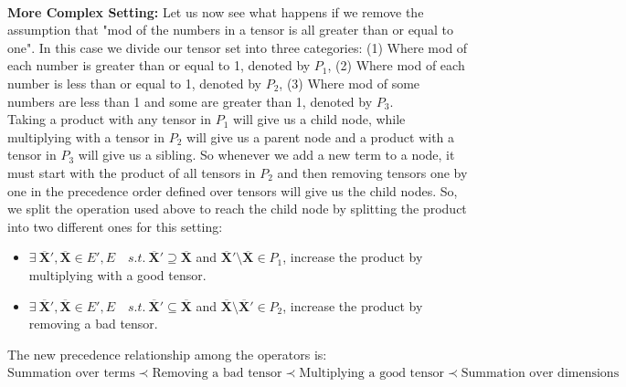 \documentclass{article}
\newcommand{\TX}{\textbf{X}\xspace}
\begin{document}
\\
\textbf{More Complex Setting:} Let us now see what happens if we remove the assumption that "mod of the numbers in a tensor is all greater than or equal to one". In this case we divide our tensor set into three categories: (1) Where mod of each number is greater than or equal to 1, denoted by $P_1$, (2) Where mod of each number is less than or equal to 1, denoted by $P_2$, (3) Where mod of some numbers are less than 1 and some are greater than 1, denoted by $P_3$.
\\
Taking a product with any tensor in $P_1$ will give us a child node, while multiplying with a tensor in $P_2$ will give us a parent node and a product with a tensor in $P_3$ will give us a sibling.
So whenever we add a new term to a node, it must start with the product of all tensors in $P_2$ and then removing tensors one by one in the precedence order defined over tensors will give us the child nodes. So, we split the operation used above to reach the child node by splitting the product into two different ones for this setting:
\begin{itemize}
\item $\exists \ \overline{\TX}',\overline{\TX} \in E',E \quad s.t. \  \overline{\TX}' \supseteq \overline{\TX}$ and $\overline{\TX}' \setminus \overline{\TX} \in P_1 $, increase the product by multiplying with a good tensor.
\item $\exists \ \overline{\TX}',\overline{\TX} \in E',E \quad s.t. \ \overline{\TX}' \subseteq \overline{\TX}$ and $\overline{\TX} \setminus \overline{\TX}' \in P_2$, increase the product by removing a bad tensor.
\end{itemize}
The new precedence relationship among the operators is:
$\text{Summation over terms} \prec \text{Removing a bad tensor} \prec \text{Multiplying a good tensor} \prec \text{Summation over dimensions}$
\end{document}
